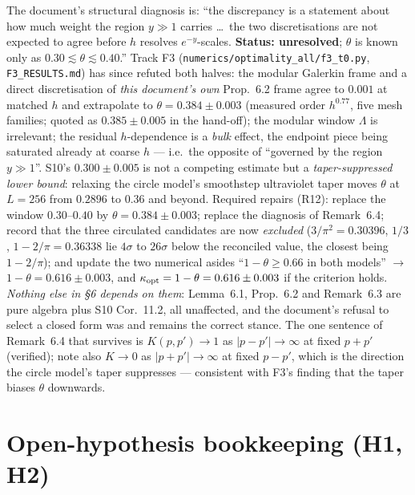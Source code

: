 \documentclass[11pt]{article}
\begin{document}
\begin{verdictbreak}
The document's structural diagnosis is: ``the discrepancy is a statement about how much
weight the region $y\gg1$ carries \dots\ the two discretisations are not expected to agree
before $h$ resolves $e^{-y}$-scales.  \textbf{Status: unresolved}; $\theta$ is known only
as $0.30\lesssim\theta\lesssim0.40$.''  Track F3 (\texttt{numerics/optimality\_all/f3\_t0.py},
\texttt{F3\_RESULTS.md}) has since refuted both halves: the modular Galerkin frame and a
direct discretisation of \emph{this document's own} Prop.~6.2 frame agree to $0.001$ at
matched $h$ and extrapolate to $\theta=0.384\pm0.003$ (measured order $h^{0.77}$, five mesh families; quoted as $0.385\pm0.005$ in the hand-off); the modular window $\Lambda$ is
irrelevant; the residual $h$-dependence is a \emph{bulk} effect, the endpoint piece being
saturated already at coarse $h$ --- i.e.\ the opposite of ``governed by the region
$y\gg1$''.  S10's $0.300\pm0.005$ is not a competing estimate but a \emph{taper-suppressed
lower bound}: relaxing the circle model's smoothstep ultraviolet taper moves $\theta$ at
$L=256$ from $0.2896$ to $0.36$ and beyond.  Required repairs (R12): replace the window
$0.30$--$0.40$ by $\theta=0.384\pm0.003$; replace the diagnosis of Remark~6.4; record that
the three circulated candidates are now \emph{excluded} ($3/\pi^2=0.30396$, $1/3$,
$1-2/\pi=0.36338$ lie $4\sigma$ to $26\sigma$ below the reconciled value, the closest being $1-2/\pi$);
and update the two numerical asides ``$1-\theta\ge0.66$ in both models'' $\to$
$1-\theta=0.616\pm0.003$, and $\kappa_{\rm opt}=1-\theta=0.616\pm0.003$ if the criterion
holds.  \emph{Nothing else in \S6 depends on them}: Lemma~6.1, Prop.~6.2 and Remark~6.3 are
pure algebra plus S10 Cor.~11.2, all unaffected, and the document's refusal to select a
closed form was and remains the correct stance.  The one sentence of Remark~6.4 that
survives is $K(p,p')\to1$ as $|p-p'|\to\infty$ at fixed $p+p'$ (verified); note also
$K\to0$ as $|p+p'|\to\infty$ at fixed $p-p'$, which is the direction the circle model's
taper suppresses --- consistent with F3's finding that the taper biases $\theta$ downwards.
\end{verdictbreak}

\section{Open-hypothesis bookkeeping (H1, H2)}\label{sec:hyp}
\end{document}
